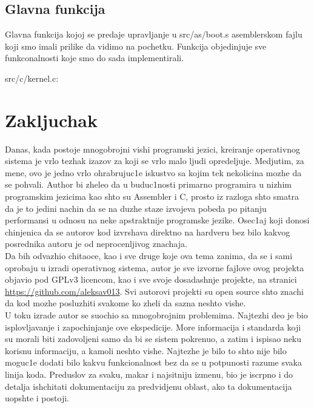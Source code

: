 \documentclass[a4paper,fleqn,12pt]{JMThesis}
\newcommand\eng{\fontencoding{OT1}\fontfamily{\rmdefault}\selectfont}
\newcommand\srb{\fontencoding{OT2}\fontfamily{\rmdefault}\selectfont}
\begin{document}
\section{Glavna funkcija}
\medskip

Glavna funkcija kojoj se predaje upravljanje u {\eng src/as/boot.s}
asemblerskom fajlu koji smo imali prilike da vidimo na pochetku. Funkcija
objedinjuje sve funkconalnosti koje smo do sada implementirali.

{\eng src/c/kernel.c}:

\medskip\begin{minipage}{\textwidth}\eng\srb\end{minipage}\smallskip


\chapter{Zakljuchak}

Danas, kada postoje mnogobrojni vishi programski jezici, kreiranje operativnog
sistema je vrlo tezhak izazov za koji se vrlo malo ljudi opredeljuje.
Medjutim, za mene, ovo je jedno vrlo ohrabrujuc1e iskustvo sa kojim tek
nekolicina mozhe da se pohvali. Author bi zheleo da u buduc1nosti primarno
programira u nizhim programskim jezicima kao shto su {\eng Assembler} i {\eng
C}, prosto iz razloga shto smatra da je to jedini nachin da se na duzhe staze
izvojeva pobeda po pitanju performansi u odnosu na neke apstraktnije programske
jezike. Osec1aj koji donosi chinjenica da se autorov kod izvrshava direktno na
hardveru bez bilo kakvog posrednika autoru je od neprocenljivog znachaja.\\

Da bih odvazhio chitaoce, kao i sve druge koje ova tema zanima, da se i sami
oprobaju u izradi operativnog sistema, autor je sve izvorne fajlove ovog
projekta objavio pod {\eng GPLv3} licencom, kao i sve svoje dosadashnje
projekte, na stranici {\eng\url{https://github.com/aleksav013}}. Svi autorovi
projekti su {\eng open source} shto znachi da kod mozhe posluzhiti svakome ko
zheli da sazna neshto vishe.\\

U toku izrade autor se suochio sa mnogobrojnim problemima. Najtezhi deo je bio
isplovljavanje i zapochinjanje ove ekspedicije. More informacija i standarda
koji su morali biti zadovoljeni samo da bi se sistem pokrenuo, a zatim i
ispisao neku korisnu informaciju, a kamoli neshto vishe. Najtezhe je bilo to
shto nije bilo moguc1e dodati bilo kakvu funkcionalnost bez da se u potpunosti
razume svaka linija koda. Preduslov za svaku, makar i najsitniju izmenu, bio je
iscrpno i do detalja ish\/chitati dokumentaciju za predvidjenu oblast, ako ta
dokumentacija uopshte i postoji.\\
\end{document}
